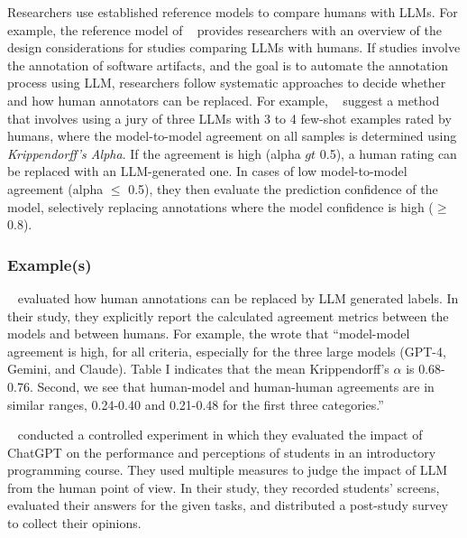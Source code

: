 Researchers \should use established reference models to compare humans with LLMs.
For example, the reference model of \citeauthor{Schneider2025ReferenceModel}~\cite{Schneider2025ReferenceModel} provides researchers with an overview of the design considerations for studies comparing LLMs with humans.
If studies involve the annotation of software artifacts, and the goal is to automate the annotation process using LLM, researchers \should follow systematic approaches to decide whether and how human annotators can be replaced.
For example, \citeauthor{DBLP:conf/msr/AhmedDTP25}~\cite{DBLP:conf/msr/AhmedDTP25} suggest a method that involves using a jury of three LLMs with 3 to 4 few-shot examples rated by humans, where the model-to-model agreement on all samples is determined using \emph{Krippendorff's Alpha}.
If the agreement is high (alpha $gt$ 0.5), a human rating can be replaced with an LLM-generated one.
In cases of low model-to-model agreement (alpha $\le$ 0.5), they then evaluate the prediction confidence of the model, selectively replacing annotations where the model confidence is high ($\ge$ 0.8).

\subsubsection{Example(s)}

\citeauthor{DBLP:conf/msr/AhmedDTP25}~\cite{DBLP:conf/msr/AhmedDTP25} evaluated how human annotations can be replaced by LLM generated labels.
In their study, they explicitly report the calculated agreement metrics between the models and between humans.
For example, the wrote that ``model-model agreement is high, for all criteria, especially for the three large models (GPT-4, Gemini, and Claude). Table I indicates that the mean Krippendorff's $\alpha$ is 0.68-0.76.  Second, we see that human-model and human-human agreements are in similar ranges, 0.24-0.40 and 0.21-0.48 for the first three categories.''

\citeauthor{DBLP:conf/icse/XueCBTH24}~\cite{DBLP:conf/icse/XueCBTH24} conducted a controlled experiment in which they evaluated the impact of ChatGPT on the performance and perceptions of students in an introductory programming course.
They used multiple measures to judge the impact of LLM from the human point of view.
In their study, they recorded students' screens, evaluated their answers for the given tasks, and distributed a post-study survey to collect their opinions.

